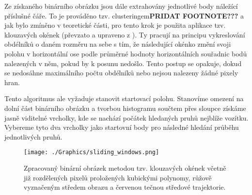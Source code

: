 \documentclass[czech, bc, kky, he, iso690numb]{fasthesis}
\begin{document}
            	Ze získaného binárního obrázku jsou dále extrahovány jednotlivé body náležící příslušné čáře. To je prováděno tzv. clusteringem\textbf{PRIDAT FOOTNOTE???} a jak bylo zmíněno v teoretické části, pro tento krok je použita aplikace tzv. klouzavých okének (převzato a upraveno z \cite{sliding_window}). Ty pracují na principu vykreslování obdélníků o daném rozměru na sebe s tím, že následující okénko změní svoji polohu v horizontální ose podle průměrné hodnoty horizontálních souřadnic bodů nalezených v něm, pokud by k posunu nedošlo. Tento postup se opakuje, dokud se nedosáhne maximálního počtu obdélníků nebo nejsou nalezeny žádné pixely hran.
            	
            	Tento algoritmus ale vyžaduje stanovit startovací polohu. Stanovíme omezení na dolní část binárního obrázku a tvorbou histogramu součtem přes sloupce získáme jasně viditelné vrcholky, kde se nachází počátek hledaných pruhů nejblíže vozítku. Vybereme tyto dva vrcholky jako startovní body pro následné hledání průběhu jednotlivých pruhů.
            	
            		\begin{figure}[h]
            			\centering
            			\texttt{[image: ./Graphics/sliding\_windows.png]}
            			\caption{Zpracovaný binární obrázek metodou tzv. klouzavých okének včetně již rozdělených pixelů proložených kubickými polynomy, růžově vyznačeným středem obrazu a červenou tečnou středové trajektorie.}
            			\label{pic:sliding_windows}
            		\end{figure}
            	
\end{document}
